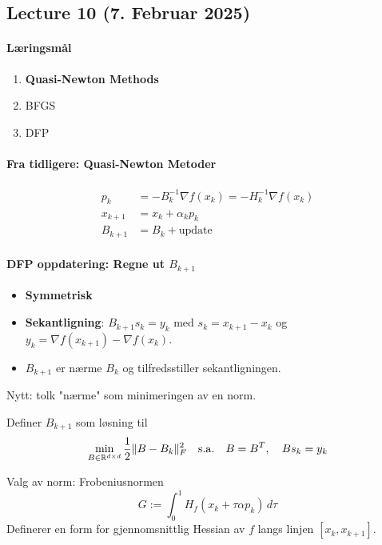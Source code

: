 \clearpage

\subsection{Lecture 10 (7. Februar 2025)}

\paragraph{Læringsmål}
\begin{enumerate}
  \item \textbf{Quasi-Newton Methods}
  \item BFGS
  \item DFP
\end{enumerate}

\paragraph{Fra tidligere: Quasi-Newton Metoder}
\begin{align*}
  p_k     & = -B_k^{-1} \nabla f(x_k) = -H_k^{-1} \nabla f(x_k) \\
  x_{k+1} & = x_k + \alpha_k p_k                                \\
  B_{k+1} & = B_k + \text{update}
\end{align*}

\paragraph{DFP oppdatering: Regne ut \(B_{k+1}\)}
\begin{itemize}
  \item \textbf{Symmetrisk}
  \item \textbf{Sekantligning}: \(B_{k+1} s_k = y_k\) med \(s_k = x_{k+1} - x_k\) og \(y_k = \nabla f(x_{k+1}) - \nabla f(x_k)\).
  \item \(B_{k+1}\) er nærme \(B_k\) og tilfredsstiller sekantligningen.
\end{itemize}

Nytt: tolk "nærme" som minimeringen av en norm.

Definer \( B_{k+1} \) som løsning til
\[
  \min_{B \in \mathbb{R}^{d \times d}} \frac{1}{2} \lVert B - B_k\rVert_F^2 \quad \text{s.a.} \quad B = B^T, \quad B s_k = y_k
\]

Valg av norm: Frobeniusnormen
\[
  G := \int_0^1 H_f(x_k + \tau \alpha p_k) \, d\tau
\]
Definerer en form for gjennomsnittlig Hessian av \( f \) langs linjen \([x_k, x_{k+1}]\).

